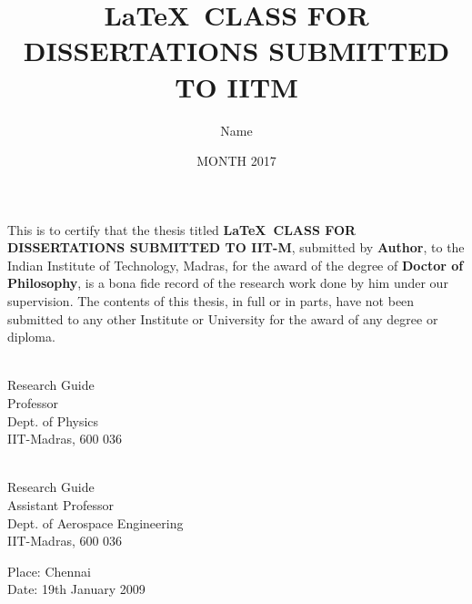 \documentclass[DD]{iitmdiss}
\begin{document}

\title{\LaTeX\ CLASS FOR DISSERTATIONS SUBMITTED TO IITM}

\author{Name}

\date{MONTH 2017}

\maketitle

\certificate

\vspace*{0.5in}

\noindent This is to certify that the thesis titled {\bf \LaTeX\ CLASS  
  FOR DISSERTATIONS SUBMITTED TO IIT-M}, submitted by {\bf Author}, 
  to the Indian Institute of Technology, Madras, for
the award of the degree of {\bf Doctor of Philosophy}, is a bona fide
record of the research work done by him under our supervision.  The
contents of this thesis, in full or in parts, have not been submitted
to any other Institute or University for the award of any degree or
diploma.

\vspace*{1.5in}

\begin{singlespacing}
\hspace*{-0.25in}
\parbox{2.5in}{
 \\
\noindent Research Guide \\ 
\noindent Professor \\
\noindent Dept. of Physics\\
\noindent IIT-Madras, 600 036 \\
} 
\hspace*{1.0in} 
\parbox{2.5in}{
 \\
\noindent Research Guide \\ 
\noindent Assistant Professor \\
\noindent Dept.  of  Aerospace Engineering\\
\noindent IIT-Madras, 600 036 \\
}  
\end{singlespacing}
\vspace*{0.25in}

\noindent Place: Chennai\\
Date: 19th January 2009 
\end{document}
